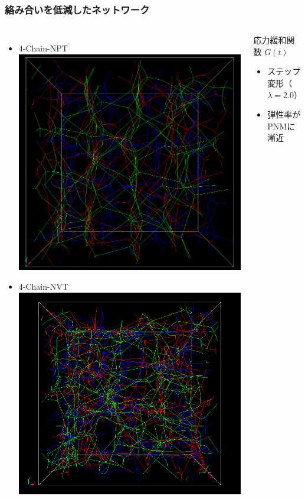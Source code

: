 \documentclass[12pt, dvipdfmx]{beamer}
\begin{document}
\begin{frame}
    \frametitle{絡み合いを低減したネットワーク}
        \vspace{-3mm}
		\begin{columns}[T, onlytextwidth]
                \small
				\begin{itemize}
					\item 4-Chain-\alert{NPT}
					\includegraphics[width=.62\textwidth]{NPT_PPA.png}
					\item 4-Chain-NVT
					\includegraphics[width=.62\textwidth]{N48_f4_PPA.png}
				\end{itemize}
			\begin{block}{応力緩和関数 $G(t)$}
				\begin{itemize}
					\item ステップ変形（$\lambda=2.0$）
					\item 弾性率がPNMに漸近
				\end{itemize}

\end{block}
\end{columns}
\end{frame}
\end{document}
